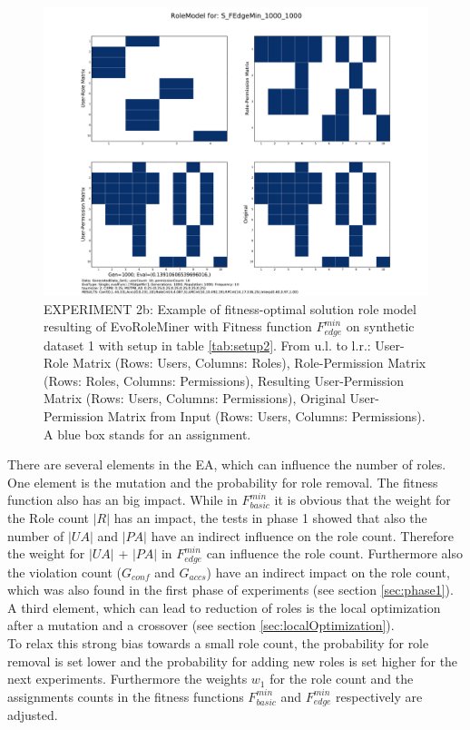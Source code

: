 \begin{figure}[H]
	\centering
	\includegraphics[scale=0.37, trim=4cm 2cm 4cm 2cm, clip=true]{./Figures/exp2edge_RM}
	\caption{EXPERIMENT 2b: Example of fitness-optimal solution role model resulting of EvoRoleMiner with Fitness function $F_{edge}^{min}$ on synthetic dataset 1 with setup in table \ref{tab:setup2}. From u.l. to l.r.: User-Role Matrix (Rows: Users, Columns: Roles), Role-Permission Matrix (Rows: Roles, Columns: Permissions), Resulting User-Permission Matrix (Rows: Users, Columns: Permissions), Original User-Permission Matrix from Input (Rows: Users, Columns: Permissions). A blue box stands for an assignment.}
	\label{fig:exp2edge_RM}
\end{figure}

There are several elements in the EA, which can influence the number of roles. One element is the mutation and the probability for role removal. The fitness function also has an big impact. While in $F_{basic}^{min}$ it is obvious that the weight for the Role count $|R|$ has an impact, the tests in phase 1 showed that also the number of $|UA|$ and $|PA|$ have an indirect influence on the role count. Therefore the weight for $|UA|$ + $|PA|$ in $F_{edge}^{min}$ can influence the role count. Furthermore also the violation count ($G_{conf}$ and $G_{accs}$) have an indirect impact on the role count, which was also found in the first phase of experiments (see section \ref{sec:phase1}). A third element, which can lead to reduction of roles is the local optimization after a mutation and a crossover (see section \ref{sec:localOptimization}).\\
To relax this strong bias towards a small role count, the probability for role removal is set lower and the probability for adding new roles is set higher for the next experiments. Furthermore the weights $w_1$ for the role count and the assignments counts in the fitness functions $F_{basic}^{min}$ and $F_{edge}^{min}$ respectively are adjusted.